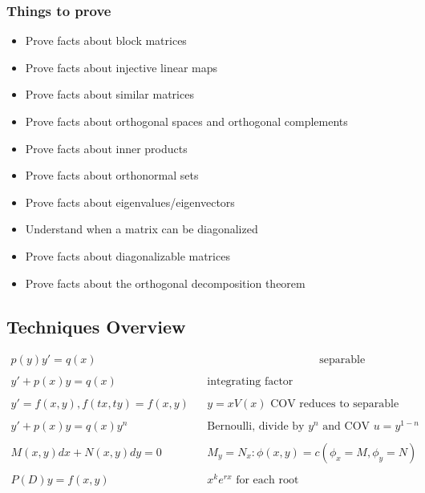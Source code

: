 \hypertarget{things-to-prove}{%
\subsubsection{Things to prove}\label{things-to-prove}}

\begin{itemize}
\tightlist
\item
  Prove facts about block matrices
\item
  Prove facts about injective linear maps
\item
  Prove facts about similar matrices
\item
  Prove facts about orthogonal spaces and orthogonal complements
\item
  Prove facts about inner products
\item
  Prove facts about orthonormal sets
\item
  Prove facts about eigenvalues/eigenvectors
\item
  Understand when a matrix can be diagonalized
\item
  Prove facts about diagonalizable matrices
\item
  Prove facts about the orthogonal decomposition theorem
\end{itemize}

\hypertarget{techniques-overview}{%
\subsection{Techniques Overview}\label{techniques-overview}}

\begin{align*}
p(y)y' = q(x) && \hspace{10em} \text{separable} \\ \\
y'+p(x)y = q(x) && \text{integrating factor} \\ \\
y' = f(x,y), f(tx,ty) = f(x,y) && y = xV(x)\text{ COV reduces to separable} \\ \\
y' +p(x)y = q(x)y^n && \text{Bernoulli, divide by $y^n$ and COV $u = y^{1-n}$} \\ \\
M(x,y)dx + N(x,y)dy = 0 && M_y = N_x: \phi(x,y) = c (\phi_x =M, \phi_y = N) \\ \\
P(D)y = f(x,y) && x^ke^{rx} \text{ for each root }
\end{align*}

